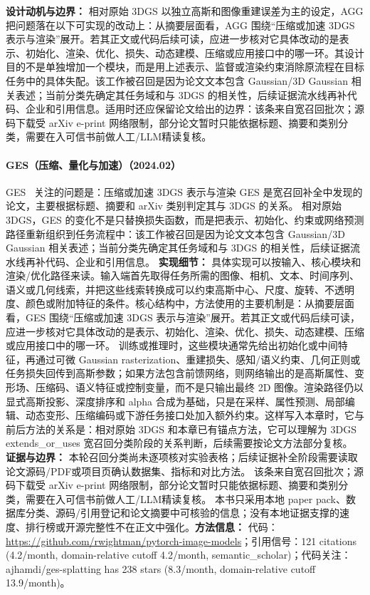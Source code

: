 \textbf{设计动机与边界：} 相对原始 3DGS 以独立高斯和图像重建误差为主的设定，AGG 把问题落在以下可实现的改动上：从摘要层面看，AGG 围绕“压缩或加速 3DGS 表示与渲染”展开。若其正文或代码后续可读，应进一步核对它具体改动的是表示、初始化、渲染、优化、损失、动态建模、压缩或应用接口中的哪一环。其设计目的不是单独增加一个模块，而是用上述表示、监督或渲染约束消除原流程在目标任务中的具体失配。该工作被召回是因为论文文本包含 Gaussian/3D Gaussian 相关表述；当前分类先确定其任务域和与 3DGS 的相关性，后续证据流水线再补代码、企业和引用信息。适用时还应保留论文给出的边界：该条来自宽召回批次；源码下载受 arXiv e-print 网络限制，部分论文暂时只能依据标题、摘要和类别分类，需要在入可信书前做人工/LLM精读复核。
\paragraph{GES（压缩、量化与加速）（2024.02）}
GES~\cite{2402_10128} 关注的问题是：压缩或加速 3DGS 表示与渲染 GES 是宽召回补全中发现的论文，主要根据标题、摘要和 arXiv 类别判定其与 3DGS 的关系。
相对原始 3DGS，GES 的变化不是只替换损失函数，而是把表示、初始化、约束或网络预测路径重新组织到任务流程中：该工作被召回是因为论文文本包含 Gaussian/3D Gaussian 相关表述；当前分类先确定其任务域和与 3DGS 的相关性，后续证据流水线再补代码、企业和引用信息。
\textbf{实现细节：} 具体实现可以按输入、核心模块和渲染/优化路径来读。输入端首先取得任务所需的图像、相机、文本、时间序列、语义或几何线索，并把这些线索转换成可以约束高斯中心、尺度、旋转、不透明度、颜色或附加特征的条件。核心结构中，方法使用的主要机制是：从摘要层面看，GES 围绕“压缩或加速 3DGS 表示与渲染”展开。若其正文或代码后续可读，应进一步核对它具体改动的是表示、初始化、渲染、优化、损失、动态建模、压缩或应用接口中的哪一环。 训练或推理时，这些模块通常先给出初始化或中间特征，再通过可微 Gaussian rasterization、重建损失、感知/语义约束、几何正则或任务损失回传到高斯参数；如果方法包含前馈网络，则网络输出的是高斯属性、变形场、压缩码、语义特征或控制变量，而不是只输出最终 2D 图像。渲染路径仍以显式高斯投影、深度排序和 alpha 合成为基础，只是在采样、属性预测、局部编辑、动态变形、压缩编码或下游任务接口处加入额外约束。这样写入本章时，它与前后方法的关系是：相对原始 3DGS 和本章已有锚点方法，它可以理解为 3DGS extends\_or\_uses 宽召回分类阶段的关系判断，后续需要按论文方法部分复核。
\textbf{证据与边界：} 本轮召回分类尚未逐项核对实验表格；后续证据补全阶段需要读取论文源码/PDF或项目页确认数据集、指标和对比方法。 该条来自宽召回批次；源码下载受 arXiv e-print 网络限制，部分论文暂时只能依据标题、摘要和类别分类，需要在入可信书前做人工/LLM精读复核。 本书只采用本地 paper pack、数据库分类、源码/引用登记和论文摘要中可核验的信息；没有本地证据支撑的速度、排行榜或开源完整性不在正文中强化。\textbf{方法信息：} 代码：\url{https://github.com/rwightman/pytorch-image-models}；引用信号：121 citations (4.2/month, domain-relative cutoff 4.2/month, semantic\_scholar)；代码关注：ajhamdi/ges-splatting has 238 stars (8.3/month, domain-relative cutoff 13.9/month)。
